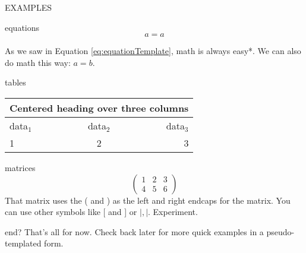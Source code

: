 \documentclass{article}
\begin{document}
\begin{section}{EXAMPLES}
\begin{subsection}{equations}
\begin{equation}
	\label{eq:equationTemplate}
	a=a
\end{equation}

As we saw in Equation \ref{eq:equationTemplate}, math is always easy*. We can also do math this way: $a=b$.
\end{subsection}



\begin{subsection}{tables}
	\begin{tabular}{ l | c | r}
		\multicolumn{3}{c}{Centered heading over three columns} \\
		\hline %
		data$_1$ & data$_2$ & data$_3$ \\
		1 & 2 & 3
	\end{tabular}
\end{subsection}

\begin{subsection}{matrices}
	\begin{equation}
		\left(\begin{array}{ccc}
		1 & 2& 3 \\
		4 & 5 &6 \end{array}\right)
	\end{equation}
	That matrix uses the ( and ) as the left and right endcaps for the matrix. You can use other symbols like [ and ] or $\left|,\right|$. Experiment.
\end{subsection}

\begin{subsection}{end?}
	That's all for now. Check back later for more quick examples in a pseudo-templated form.
\end{subsection}

\end{section}
\end{document}

